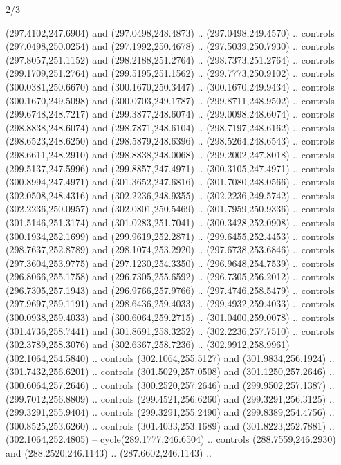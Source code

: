 \begin{flagdescription}{2/3}
\begin{scope}[xshift=0.5\flaglength,yshift=0.5\flagwidth,scale=\flagwidth/235.81]
\begin{scope}[y=0.8pt, x=0.8pt, yscale=-1,shift={(-239.08,-147.38)}]
    (297.4102,247.6904) and (297.0498,248.4873) .. (297.0498,249.4570) .. controls
    (297.0498,250.0254) and (297.1992,250.4678) .. (297.5039,250.7930) .. controls
    (297.8057,251.1152) and (298.2188,251.2764) .. (298.7373,251.2764) .. controls
    (299.1709,251.2764) and (299.5195,251.1562) .. (299.7773,250.9102) .. controls
    (300.0381,250.6670) and (300.1670,250.3447) .. (300.1670,249.9434) .. controls
    (300.1670,249.5098) and (300.0703,249.1787) .. (299.8711,248.9502) .. controls
    (299.6748,248.7217) and (299.3877,248.6074) .. (299.0098,248.6074) .. controls
    (298.8838,248.6074) and (298.7871,248.6104) .. (298.7197,248.6162) .. controls
    (298.6523,248.6250) and (298.5879,248.6396) .. (298.5264,248.6543) .. controls
    (298.6611,248.2910) and (298.8838,248.0068) .. (299.2002,247.8018) .. controls
    (299.5137,247.5996) and (299.8857,247.4971) .. (300.3105,247.4971) .. controls
    (300.8994,247.4971) and (301.3652,247.6816) .. (301.7080,248.0566) .. controls
    (302.0508,248.4316) and (302.2236,248.9355) .. (302.2236,249.5742) .. controls
    (302.2236,250.0957) and (302.0801,250.5469) .. (301.7959,250.9336) .. controls
    (301.5146,251.3174) and (301.0283,251.7041) .. (300.3428,252.0908) .. controls
    (300.1934,252.1699) and (299.9619,252.2871) .. (299.6455,252.4453) .. controls
    (298.7637,252.8789) and (298.1074,253.2920) .. (297.6738,253.6846) .. controls
    (297.3604,253.9775) and (297.1230,254.3350) .. (296.9648,254.7539) .. controls
    (296.8066,255.1758) and (296.7305,255.6592) .. (296.7305,256.2012) .. controls
    (296.7305,257.1943) and (296.9766,257.9766) .. (297.4746,258.5479) .. controls
    (297.9697,259.1191) and (298.6436,259.4033) .. (299.4932,259.4033) .. controls
    (300.0938,259.4033) and (300.6064,259.2715) .. (301.0400,259.0078) .. controls
    (301.4736,258.7441) and (301.8691,258.3252) .. (302.2236,257.7510) .. controls
    (302.3789,258.3076) and (302.6367,258.7236) ..
    (302.9912,258.9961)(302.1064,254.5840) .. controls (302.1064,255.5127) and
    (301.9834,256.1924) .. (301.7432,256.6201) .. controls (301.5029,257.0508) and
    (301.1250,257.2646) .. (300.6064,257.2646) .. controls (300.2520,257.2646) and
    (299.9502,257.1387) .. (299.7012,256.8809) .. controls (299.4521,256.6260) and
    (299.3291,256.3125) .. (299.3291,255.9404) .. controls (299.3291,255.2490) and
    (299.8389,254.4756) .. (300.8525,253.6260) .. controls (301.4033,253.1689) and
    (301.8223,252.7881) .. (302.1064,252.4805) -- cycle(289.1777,246.6504) ..
    controls (288.7559,246.2930) and (288.2520,246.1143) .. (287.6602,246.1143) ..

\end{scope}
\end{scope}
\end{flagdescription}
